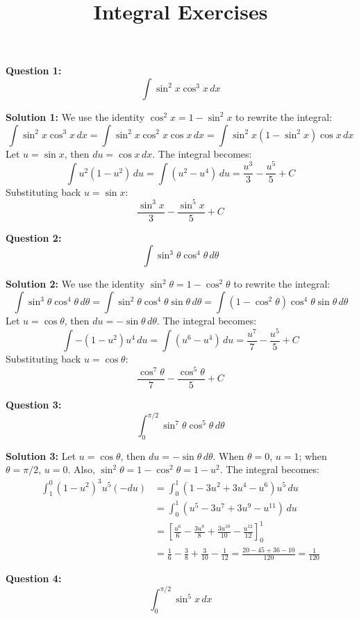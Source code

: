 \documentclass{article}
\title{Integral Exercises}
\author{}
\date{}
\begin{document}
\maketitle

\textbf{Question 1:}
\[ \int \sin^2 x \cos^3 x \, dx \]

\textbf{Solution 1:}
We use the identity $\cos^2 x = 1 - \sin^2 x$ to rewrite the integral:
\[ \int \sin^2 x \cos^3 x \, dx = \int \sin^2 x \cos^2 x \cos x \, dx = \int \sin^2 x (1 - \sin^2 x) \cos x \, dx \]
Let $u = \sin x$, then $du = \cos x \, dx$.  The integral becomes:
\[ \int u^2 (1 - u^2) \, du = \int (u^2 - u^4) \, du = \frac{u^3}{3} - \frac{u^5}{5} + C \]
Substituting back $u = \sin x$:
\[ \frac{\sin^3 x}{3} - \frac{\sin^5 x}{5} + C \]

\bigskip

\textbf{Question 2:}
\[ \int \sin^3 \theta \cos^4 \theta \, d\theta \]

\textbf{Solution 2:}
We use the identity $\sin^2 \theta = 1 - \cos^2 \theta$ to rewrite the integral:
\[ \int \sin^3 \theta \cos^4 \theta \, d\theta = \int \sin^2 \theta \cos^4 \theta \sin \theta \, d\theta = \int (1 - \cos^2 \theta) \cos^4 \theta \sin \theta \, d\theta \]
Let $u = \cos \theta$, then $du = -\sin \theta \, d\theta$. The integral becomes:
\[ \int -(1 - u^2) u^4 \, du = \int (u^6 - u^4) \, du = \frac{u^7}{7} - \frac{u^5}{5} + C \]
Substituting back $u = \cos \theta$:
\[ \frac{\cos^7 \theta}{7} - \frac{\cos^5 \theta}{5} + C \]

\bigskip

\textbf{Question 3:}
\[ \int_0^{\pi/2} \sin^7 \theta \cos^5 \theta \, d\theta \]

\textbf{Solution 3:}
Let $u = \cos \theta$, then $du = -\sin \theta \, d\theta$. When $\theta = 0$, $u = 1$; when $\theta = \pi/2$, $u = 0$.  Also, $\sin^2 \theta = 1 - \cos^2 \theta = 1 - u^2$.  The integral becomes:
\begin{align*} \int_1^0 (1 - u^2)^3 u^5 (-du) &= \int_0^1 (1 - 3u^2 + 3u^4 - u^6) u^5 \, du \\ &= \int_0^1 (u^5 - 3u^7 + 3u^9 - u^{11}) \, du \\ &= \left[ \frac{u^6}{6} - \frac{3u^8}{8} + \frac{3u^{10}}{10} - \frac{u^{12}}{12} \right]_0^1 \\ &= \frac{1}{6} - \frac{3}{8} + \frac{3}{10} - \frac{1}{12} = \frac{20 - 45 + 36 - 10}{120} = \frac{1}{120}\end{align*} 

\bigskip

\textbf{Question 4:}
\[ \int_0^{\pi/2} \sin^5 x \, dx \]
\end{document}
